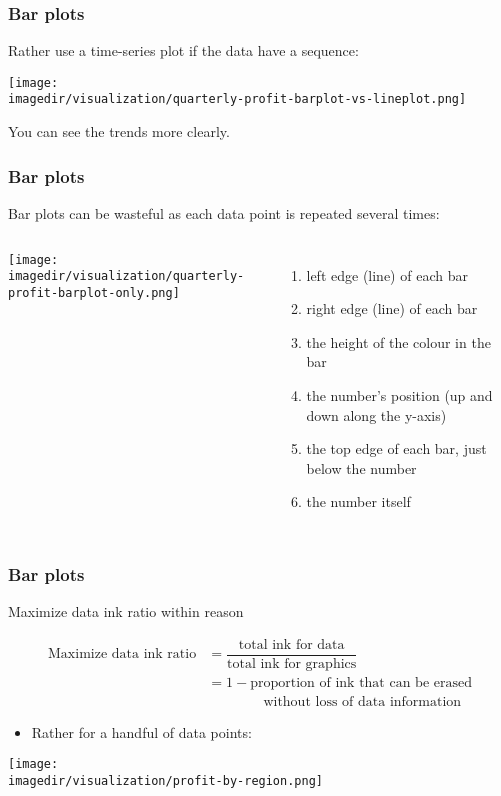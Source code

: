 \begin{frame}\frametitle{Bar plots}
	
	Rather use a time-series plot if the data have a sequence: 
	\begin{center}
		\texttt{[image: \\imagedir/visualization/quarterly-profit-barplot-vs-lineplot.png]}
	\end{center}
	You can see the trends more clearly.
\end{frame}

\begin{frame}\frametitle{Bar plots}
	
	Bar plots can be wasteful as each data point is repeated several times:
	\vspace{-8pt}
	\begin{columns}[c]
		\column{6cm} 
			\begin{center}
				\texttt{[image: \\imagedir/visualization/quarterly-profit-barplot-only.png]} 
			\end{center}
		\column{4cm} 
			\begin{enumerate}
				\item	left edge (line) of each bar 
				\item	right edge (line) of each bar 
				\item	the height of the colour in the bar 
				\item	the number's position (up and down along the y-axis) 
				\item	the top edge of each bar, just below the number 
				\item	the number itself 
			\end{enumerate}
	\end{columns}
\end{frame}

\begin{frame}\frametitle{Bar plots}
	\begin{exampleblock}{Maximize data ink ratio within reason}
		\begin{center}
			\[
				\begin{array}{rl}
					\text{Maximize data ink ratio} 	&= \dfrac{\text{total ink for data}}{{\text{total ink for graphics}}} \\
													&= 1 - \text{proportion of ink that can be erased} \\
													&\qquad\qquad \text{without loss of data information} 
			\end{array}
			\]
		\end{center}
	\end{exampleblock}
	\begin{itemize}
		\item	Rather {\color{myOrange}{use a table}} for a handful of data points: 
	\end{itemize}
	\begin{center}
		\texttt{[image: \\imagedir/visualization/profit-by-region.png]}
	\end{center}
\end{frame}

